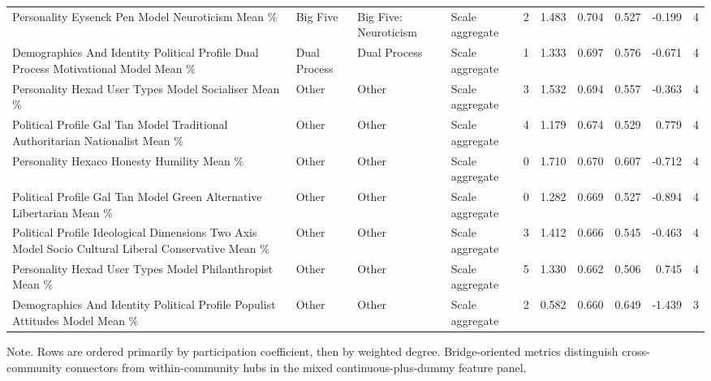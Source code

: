 \begin{table}[htbp]
\begin{threeparttable}
\begin{adjustbox}{max width=\linewidth}
\begin{tabular}{llllrrrrrr}
Personality Eysenck Pen Model Neuroticism Mean \% & Big Five & Big Five: Neuroticism & Scale aggregate & 2 & 1.483 & 0.704 & 0.527 & -0.199 & 4 \\
Demographics And Identity Political Profile Dual Process Motivational Model Mean \% & Dual Process & Dual Process & Scale aggregate & 1 & 1.333 & 0.697 & 0.576 & -0.671 & 4 \\
Personality Hexad User Types Model Socialiser Mean \% & Other & Other & Scale aggregate & 3 & 1.532 & 0.694 & 0.557 & -0.363 & 4 \\
Political Profile Gal Tan Model Traditional Authoritarian Nationalist Mean \% & Other & Other & Scale aggregate & 4 & 1.179 & 0.674 & 0.529 & 0.779 & 4 \\
Personality Hexaco Honesty Humility Mean \% & Other & Other & Scale aggregate & 0 & 1.710 & 0.670 & 0.607 & -0.712 & 4 \\
Political Profile Gal Tan Model Green Alternative Libertarian Mean \% & Other & Other & Scale aggregate & 0 & 1.282 & 0.669 & 0.527 & -0.894 & 4 \\
Political Profile Ideological Dimensions Two Axis Model Socio Cultural Liberal Conservative Mean \% & Other & Other & Scale aggregate & 3 & 1.412 & 0.666 & 0.545 & -0.463 & 4 \\
Personality Hexad User Types Model Philanthropist Mean \% & Other & Other & Scale aggregate & 5 & 1.330 & 0.662 & 0.506 & 0.745 & 4 \\
Demographics And Identity Political Profile Populist Attitudes Model Mean \% & Other & Other & Scale aggregate & 2 & 0.582 & 0.660 & 0.649 & -1.439 & 3 \\
\bottomrule
\end{tabular}
\end{adjustbox}
\begin{tablenotes}[flushleft]
\footnotesize
\item Note. Rows are ordered primarily by participation coefficient, then by weighted degree. Bridge-oriented metrics distinguish cross-community connectors from within-community hubs in the mixed continuous-plus-dummy feature panel.
\end{tablenotes}
\end{threeparttable}
\end{table}